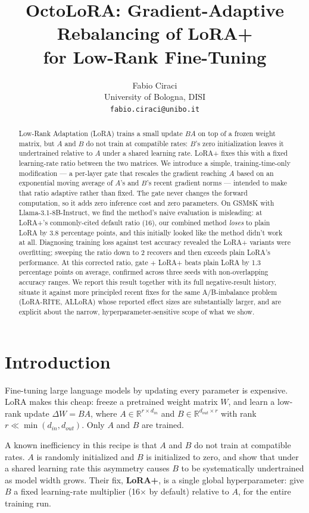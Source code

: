 \documentclass[11pt]{article}
\title{\textbf{OctoLoRA: Gradient-Adaptive Rebalancing of LoRA+ \\ for Low-Rank Fine-Tuning}}
\author{
  Fabio Ciraci \\
  \small University of Bologna, DISI \\
  \small \texttt{fabio.ciraci@unibo.it}
}
\date{}
\begin{document}
\maketitle

\begin{abstract}
Low-Rank Adaptation (LoRA) trains a small update $B A$ on top of a frozen
weight matrix, but $A$ and $B$ do not train at compatible rates: $B$'s
zero initialization leaves it undertrained relative to $A$ under a shared
learning rate. LoRA+ fixes this with a fixed learning-rate ratio between
the two matrices. We introduce a simple, training-time-only modification —
a per-layer gate that rescales the gradient reaching $A$ based on an
exponential moving average of $A$'s and $B$'s recent gradient norms —
intended to make that ratio adaptive rather than fixed. The gate never
changes the forward computation, so it adds zero inference cost and zero
parameters. On GSM8K with Llama-3.1-8B-Instruct, we find the method's
naive evaluation is misleading: at LoRA+'s commonly-cited default ratio
(16), our combined method \emph{loses} to plain LoRA by 3.8 percentage
points, and this initially looked like the method didn't work at all.
Diagnosing training loss against test accuracy revealed the LoRA+ variants
were overfitting; sweeping the ratio down to 2 recovers and then exceeds
plain LoRA's performance. At this corrected ratio, gate $+$ LoRA+ beats
plain LoRA by 1.3 percentage points on average, confirmed across three
seeds with non-overlapping accuracy ranges. We report this result together
with its full negative-result history, situate it against more principled
recent fixes for the same A/B-imbalance problem (LoRA-RITE, ALLoRA) whose
reported effect sizes are substantially larger, and are explicit about the
narrow, hyperparameter-sensitive scope of what we show.
\end{abstract}

\section{Introduction}

Fine-tuning large language models by updating every parameter is
expensive. LoRA \citep{hu2021lora} makes this cheap: freeze a pretrained
weight matrix $W$, and learn a low-rank update $\Delta W = BA$, where
$A \in \mathbb{R}^{r \times d_{in}}$ and $B \in \mathbb{R}^{d_{out} \times
r}$ with rank $r \ll \min(d_{in}, d_{out})$. Only $A$ and $B$ are trained.

A known inefficiency in this recipe is that $A$ and $B$ do not train at
compatible rates. $A$ is randomly initialized and $B$ is initialized to
zero, and \citet{hayou2024lora} show that under a shared learning rate this
asymmetry causes $B$ to be systematically undertrained as model width
grows. Their fix, \textbf{LoRA+}, is a single global hyperparameter: give
$B$ a fixed learning-rate multiplier (16$\times$ by default) relative to
$A$, for the entire training run.
\end{document}
